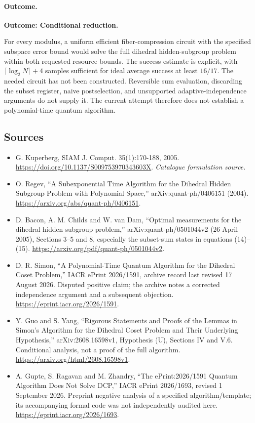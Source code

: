 \documentclass[11pt,a4paper]{article}
\begin{document}
\paragraph{Outcome.}
\textbf{Outcome: Conditional reduction.}

For every modulus, a uniform efficient fiber-compression circuit with the
specified subspace error bound would solve the full dihedral hidden-subgroup
problem within both requested resource bounds. The success estimate is
explicit, with $\lceil\log_2N\rceil+4$ samples sufficient for ideal average
success at least $16/17$. The needed circuit has not been constructed.
Reversible sum evaluation, discarding the subset register, naive
postselection, and unsupported adaptive-independence arguments do not
supply it. The current attempt therefore does not establish a
polynomial-time quantum algorithm.
\subsection{Sources}
\begin{itemize}\raggedright
\item[\textnormal{[S1]}]\hypertarget{source:30006794:1}{} G. Kuperberg, SIAM J. Comput. 35(1):170-188, 2005.
\url{https://doi.org/10.1137/S009753970343603X}.
{\small\textit{Catalogue formulation source.}}
\item[\textnormal{[E1]}]\hypertarget{extra:30006794:1}{} O. Regev, ``A Subexponential Time Algorithm for the Dihedral Hidden Subgroup Problem with Polynomial Space,'' arXiv:quant-ph/0406151 (2004).
\url{https://arxiv.org/abs/quant-ph/0406151}.
\item[\textnormal{[E2]}]\hypertarget{extra:30006794:2}{} D. Bacon, A. M. Childs and W. van Dam, ``Optimal measurements for the dihedral hidden subgroup problem,'' arXiv:quant-ph/0501044v2 (26 April 2005), Sections 3--5 and 8, especially the subset-sum states in equations (14)--(15).
\url{https://arxiv.org/pdf/quant-ph/0501044v2}.
\item[\textnormal{[E3]}]\hypertarget{extra:30006794:3}{} D. R. Simon, ``A Polynomial-Time Quantum Algorithm for the Dihedral Coset Problem,'' IACR ePrint 2026/1591, archive record last revised 17 August 2026. Disputed positive claim; the archive notes a corrected independence argument and a subsequent objection.
\url{https://eprint.iacr.org/2026/1591}.
\item[\textnormal{[E4]}]\hypertarget{extra:30006794:4}{} Y. Guo and S. Yang, ``Rigorous Statements and Proofs of the Lemmas in Simon's Algorithm for the Dihedral Coset Problem and Their Underlying Hypothesis,'' arXiv:2608.16598v1, Hypothesis (U), Sections IV and V.6. Conditional analysis, not a proof of the full algorithm.
\url{https://arxiv.org/html/2608.16598v1}.
\item[\textnormal{[E5]}]\hypertarget{extra:30006794:5}{} A. Gupte, S. Ragavan and M. Zhandry, ``The ePrint:2026/1591 Quantum Algorithm Does Not Solve DCP,'' IACR ePrint 2026/1693, revised 1 September 2026. Preprint negative analysis of a specified algorithm/template; its accompanying formal code was not independently audited here.
\url{https://eprint.iacr.org/2026/1693}.
\end{itemize}
\end{document}
